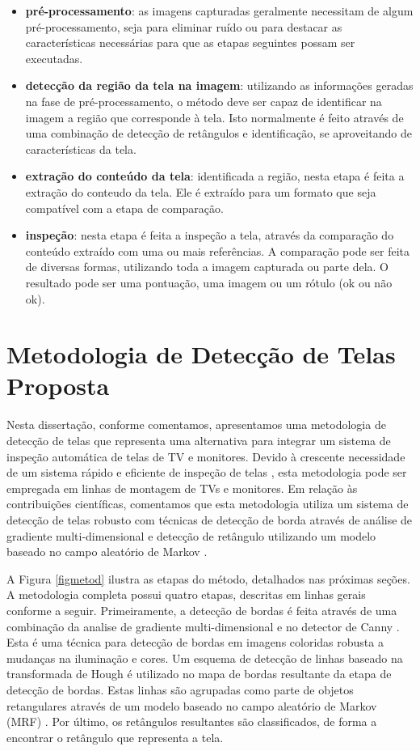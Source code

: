 \begin{itemize}
\item \textbf{pré-processamento}: as imagens capturadas geralmente necessitam de algum pré-processamento, seja para eliminar ruído ou para destacar as características necessárias para que as etapas seguintes possam ser executadas.
\item \textbf{detecção da região da tela na imagem}: utilizando as informações geradas na fase de pré-processamento, o método deve ser capaz de identificar na imagem a região que corresponde  à tela. Isto normalmente é feito através de uma combinação de detecção de retângulos e identificação, se aproveitando de características da tela.
\item \textbf{extração do conteúdo da tela}: identificada a região, nesta etapa é feita a extração do conteudo da tela. Ele é extraído para um formato que seja compatível com a etapa de comparação.
\item \textbf{inspeção}: nesta etapa é feita a inspeção a tela, através da comparação do conteúdo extraído com uma ou mais referências. A comparação pode ser feita de diversas formas, utilizando toda a imagem capturada ou parte dela. O resultado pode ser uma pontuação, uma imagem ou um rótulo (ok ou não ok).
\end{itemize}

\section{Metodologia de Detecção de Telas Proposta} \label{met:abord}

Nesta dissertação, conforme comentamos, apresentamos uma metodologia de detecção de telas que representa uma alternativa para integrar um sistema de inspeção automática de telas de TV e monitores. Devido à crescente necessidade de um sistema rápido e eficiente de inspeção de telas \cite{inspectimage03}, esta metodologia pode ser empregada em linhas de montagem de TVs e monitores. Em relação às contribuições científicas, comentamos que esta metodologia utiliza um sistema de detecção de telas robusto \cite{inspect} com técnicas de detecção de borda através de análise de gradiente multi-dimensional e detecção de retângulo utilizando um modelo baseado no campo aleatório de Markov \cite{mrf}.

A Figura \ref{figmetod} ilustra as etapas do método, detalhados nas próximas seções. A metodologia completa possui quatro etapas, descritas em linhas gerais conforme a seguir. Primeiramente, a detecção de bordas é feita através de uma combinação da analise de gradiente multi-dimensional \cite{borda00} e no detector de Canny \cite{canny}. Esta é uma técnica para detecção de bordas em imagens coloridas robusta a mudanças na iluminação e cores. Um esquema de detecção de linhas baseado na transformada de Hough é utilizado no mapa de bordas resultante da etapa de detecção de bordas. Estas linhas são agrupadas como parte de objetos retangulares através de um modelo baseado no campo aleatório de Markov (MRF) \cite{mrf}. Por último, os retângulos resultantes são classificados, de forma a encontrar o retângulo que representa a tela.

